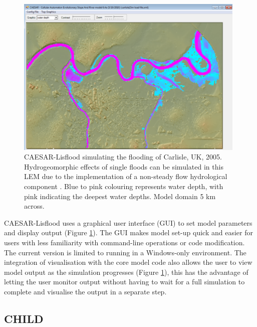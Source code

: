 \begin{figure}[t]
\includegraphics[width=11cm]{LEMFinalRevisedmanuscriptDAVFinalrevisions-img/LEMFinalRevisedmanuscriptDAVFinalrevisions-img007.png} 
\caption{CAESAR-Lisflood simulating the flooding of Carlisle, UK, 2005. Hydrogeomorphic effects of single floods can be simulated in this LEM due to the implementation of a non-steady flow hydrological component \citep{bates2010simple}. Blue to pink colouring represents water depth, with pink indicating the deepest water depths. Model domain 5 km across.}
\label{fig_LEM_CAEASR_Lisflood}
\end{figure}

CAESAR-Lisflood uses a graphical user interface (GUI) to set model parameters and display output (Figure \ref{fig_LEM_CAEASR_Lisflood}). The GUI makes model set-up quick and easier for users with less familiarity with command-line operations or code modification. The current version is limited to running in a Windows-only environment. The integration of visualisation with the core model code also allows the user to view model output as the simulation progresses (Figure \ref{fig_LEM_CAEASR_Lisflood}), this has the advantage of letting the user monitor output without having to wait for a full simulation to complete and visualise the output in a separate step. 

\subsection{CHILD}

